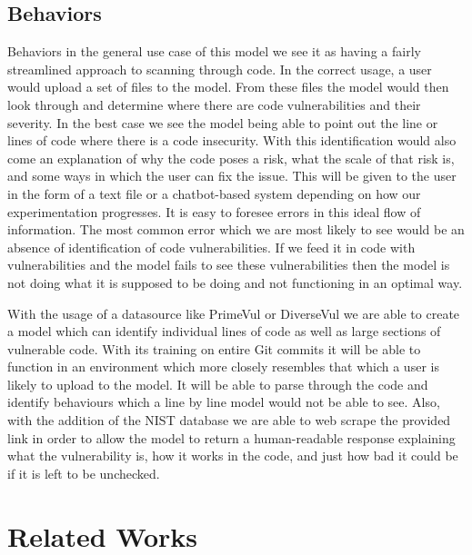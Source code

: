 \documentclass{article}
\begin{document}
\subsection{Behaviors}
Behaviors
in the general use case of this model we see it as having a fairly streamlined approach to scanning through code. In the correct usage, a user would upload a set of files to the model. From these files the model would then look through and determine where there are code vulnerabilities and their severity. In the best case we see the model being able to point out the line or lines of code where there is a code insecurity. With this identification would also come an explanation of why the code poses a risk, what the scale of that risk is, and some ways in which the user can fix the issue. This will be given to the user in the form of a text file or a chatbot-based system depending on how our experimentation progresses. 
It is easy to foresee errors in this ideal flow of information. The most common error which we are most likely to see would be an absence of identification of code vulnerabilities. If we feed it in code with vulnerabilities and the model fails to see these vulnerabilities then the model is not doing what it is supposed to be doing and not functioning in an optimal way. 

With the usage of a datasource like PrimeVul or DiverseVul we are able to create a model which can identify individual lines of code as well as large sections of vulnerable code. With its training on entire Git commits it will be able to function in an environment which more closely resembles that which a user is likely to upload to the model. It will be able to parse through the code and identify behaviours which a line by line model would not be able to see. Also, with the addition of the NIST database we are able to web scrape the provided link in order to allow the model to return a human-readable response explaining what the vulnerability is, how it works in the code, and just how bad it could be if it is left to be unchecked. 

\section{Related Works}
\end{document}
